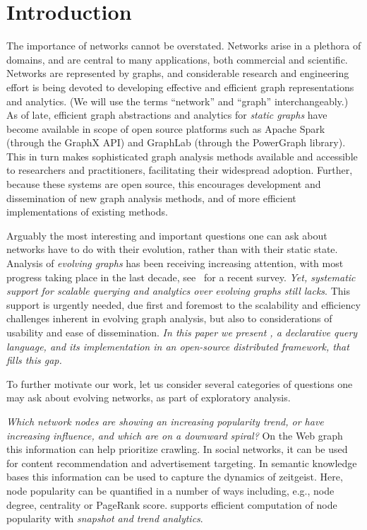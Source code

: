 \section{Introduction}
\label{sec:intro}

The importance of networks cannot be overstated. Networks arise in a
plethora of domains, and are central to many applications, both
commercial and scientific.  Networks are represented by graphs, and
considerable research and engineering effort is being devoted to
developing effective and efficient graph representations and
analytics. (We will use the terms ``network'' and ``graph''
interchangeably.) As of late, efficient graph abstractions and
analytics for {\em static graphs} have become available in scope of
open source platforms such as Apache Spark (through the GraphX API)
and GraphLab (through the PowerGraph library).  This in turn makes
sophisticated graph analysis methods available and accessible to
researchers and practitioners, facilitating their widespread adoption.
Further, because these systems are open source, this encourages
development and dissemination of new graph analysis methods, and of
more efficient implementations of existing methods.

Arguably the most interesting and important questions one can ask
about networks have to do with their evolution, rather than with their
static state.  Analysis of {\em evolving graphs} has been receiving
increasing attention, with most progress taking place in the last
decade, see~\cite{DBLP:journals/csur/AggarwalS14} for a recent survey.
{\em Yet, systematic support for scalable querying and analytics over
  evolving graphs still lacks}.  This support is urgently needed, due
first and foremost to the scalability and efficiency challenges
inherent in evolving graph analysis, but also to considerations of
usability and ease of dissemination. {\em In this paper we present
  \ql, a declarative query language, and its implementation in an
  open-source distributed framework, that fills this gap.}

To further motivate our work, let us consider several categories of
questions one may ask about evolving networks, as part of exploratory
analysis.

{\em Which network nodes are showing an increasing popularity trend,
  or have increasing influence, and which are on a downward spiral?}
On the Web graph this information can help prioritize crawling.  In
social networks, it can be used for content recommendation and
advertisement targeting.  In semantic knowledge bases this information
can be used to capture the dynamics of zeitgeist.  Here, node
popularity can be quantified in a number of ways including, e.g., node
degree, centrality or PageRank score.  \ql supports efficient
computation of node popularity with {\em snapshot and trend
  analytics}.

